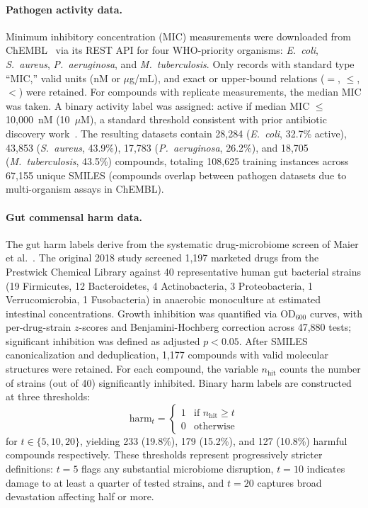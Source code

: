 \documentclass{article}
\begin{document}
\paragraph{Pathogen activity data.}
Minimum inhibitory concentration (MIC) measurements were downloaded from ChEMBL~\citep{chembl34} via its REST API for four WHO-priority organisms: \textit{E.~coli}, \textit{S.~aureus}, \textit{P.~aeruginosa}, and \textit{M.~tuberculosis}.
Only records with standard type ``MIC,'' valid units (nM or $\mu$g/mL), and exact or upper-bound relations ($=$, $\leq$, $<$) were retained.
For compounds with replicate measurements, the median MIC was taken.
A binary activity label was assigned: active if median MIC $\leq$ 10,000~nM (10~$\mu$M), a standard threshold consistent with prior antibiotic discovery work~\citep{stokes2020,wong2024}.
The resulting datasets contain 28,284 (\textit{E.~coli}, 32.7\% active), 43,853 (\textit{S.~aureus}, 43.9\%), 17,783 (\textit{P.~aeruginosa}, 26.2\%), and 18,705 (\textit{M.~tuberculosis}, 43.5\%) compounds, totaling 108,625 training instances across 67,155 unique SMILES (compounds overlap between pathogen datasets due to multi-organism assays in ChEMBL).

\paragraph{Gut commensal harm data.}
The gut harm labels derive from the systematic drug-microbiome screen of Maier et al.~\citep{maier2018,maier2021}.
The original 2018 study screened 1,197 marketed drugs from the Prestwick Chemical Library against 40 representative human gut bacterial strains (19 Firmicutes, 12 Bacteroidetes, 4 Actinobacteria, 3 Proteobacteria, 1 Verrucomicrobia, 1 Fusobacteria) in anaerobic monoculture at estimated intestinal concentrations.
Growth inhibition was quantified via OD$_{600}$ curves, with per-drug-strain $z$-scores and Benjamini-Hochberg correction across 47,880 tests; significant inhibition was defined as adjusted $p < 0.05$.
After SMILES canonicalization and deduplication, 1,177 compounds with valid molecular structures were retained.
For each compound, the variable $n_{\mathrm{hit}}$ counts the number of strains (out of 40) significantly inhibited.
Binary harm labels are constructed at three thresholds:
\begin{equation}
\mathrm{harm}_t = \begin{cases} 1 & \text{if } n_{\mathrm{hit}} \geq t \\ 0 & \text{otherwise} \end{cases}
\end{equation}
for $t \in \{5, 10, 20\}$, yielding 233 (19.8\%), 179 (15.2\%), and 127 (10.8\%) harmful compounds respectively.
These thresholds represent progressively stricter definitions: $t{=}5$ flags any substantial microbiome disruption, $t{=}10$ indicates damage to at least a quarter of tested strains, and $t{=}20$ captures broad devastation affecting half or more.
\end{document}

